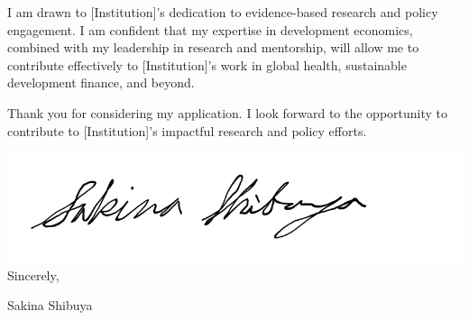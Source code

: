 \documentclass[12pt]{letter}
\begin{document}
I am drawn to [Institution]'s dedication to evidence-based research and policy engagement. I am confident that my expertise 
in development economics, combined with my leadership in research and mentorship, will allow me to contribute effectively 
to [Institution]'s work in global health, sustainable development finance, and beyond.

Thank you for considering my application. I look forward to the opportunity to contribute to [Institution]'s 
impactful research and policy efforts.

\bigskip

\includegraphics[height=4\baselineskip]{signature.png}  \\

\vspace*{-6.5\baselineskip}Sincerely, 

\vspace{2.5\baselineskip}Sakina Shibuya
\end{document}
